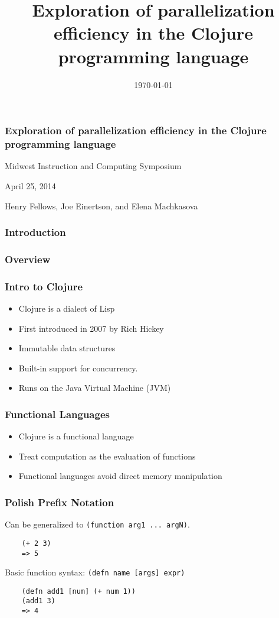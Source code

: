 \documentclass{beamer}
\newcommand{\clocode}[1]{{\texttt {#1}}}
\begin{document}
\title{Exploration of parallelization efficiency in the Clojure programming language}
\date{\today}

\begin{frame}
\frametitle{Exploration of parallelization efficiency in the Clojure programming language}
{\centering
Midwest Instruction and Computing Symposium\par
April 25, 2014\par
Henry Fellows, Joe Einertson, and Elena Machkasova\par
}
\end{frame}


\begin{frame}[fragile]
\frametitle{Introduction}
\end{frame}

\begin{frame}[fragile]
\frametitle{Overview}
\end{frame}

\begin{frame}[fragile]
\frametitle{Intro to Clojure}
	\begin{itemize}
  	 \item Clojure is a dialect of Lisp
  	 \item First introduced in 2007 by Rich Hickey
  	 \item Immutable data structures
	 \item Built-in support for concurrency.
	 \item Runs on the Java Virtual Machine (JVM)
	\end{itemize}
\end{frame}

\begin{frame}[fragile]
\frametitle{Functional Languages}
	\begin{itemize}
	 \item Clojure is a functional language
  	 \item Treat computation as the evaluation of functions
  	 \item Functional languages avoid direct memory manipulation
       \end{itemize}
\end{frame}

\begin{frame}[fragile]
\frametitle{Polish Prefix Notation}
Can be generalized to \clocode{(function arg1 ... argN)}.
	\begin{verbatim}
	(+ 2 3)
	=> 5
	\end{verbatim}
Basic function syntax: \clocode{(defn name [args] expr)}
	\begin{verbatim}
	(defn add1 [num] (+ num 1))
	(add1 3)
	=> 4
	\end{verbatim}
\end{frame}
\end{document}
